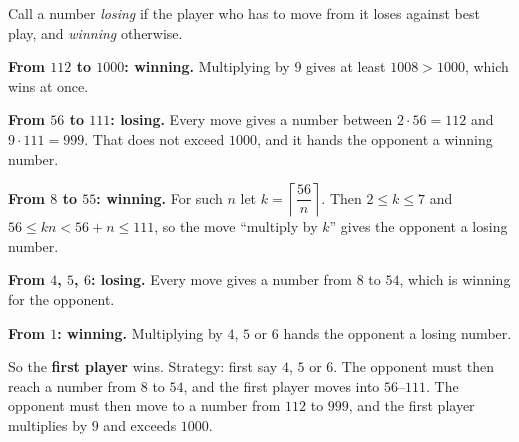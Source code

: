 Call a number \emph{losing} if the player who has to move from it loses against best play, and \emph{winning} otherwise.

\textbf{From $112$ to $1000$: winning.} Multiplying by $9$ gives at least $1008>1000$, which wins at once.

\textbf{From $56$ to $111$: losing.} Every move gives a number between $2\cdot56=112$ and $9\cdot111=999$. That does not exceed $1000$, and it hands the opponent a winning number.

\textbf{From $8$ to $55$: winning.} For such $n$ let $k=\left\lceil\dfrac{56}{n}\right\rceil$. Then $2\le k\le7$ and $56\le kn<56+n\le111$, so the move ``multiply by $k$'' gives the opponent a losing number.

\textbf{From $4$, $5$, $6$: losing.} Every move gives a number from $8$ to $54$, which is winning for the opponent.

\textbf{From $1$: winning.} Multiplying by $4$, $5$ or $6$ hands the opponent a losing number.

So the \textbf{first player} wins. Strategy: first say $4$, $5$ or $6$. The opponent must then reach a number from $8$ to $54$, and the first player moves into $56$--$111$. The opponent must then move to a number from $112$ to $999$, and the first player multiplies by $9$ and exceeds $1000$.

